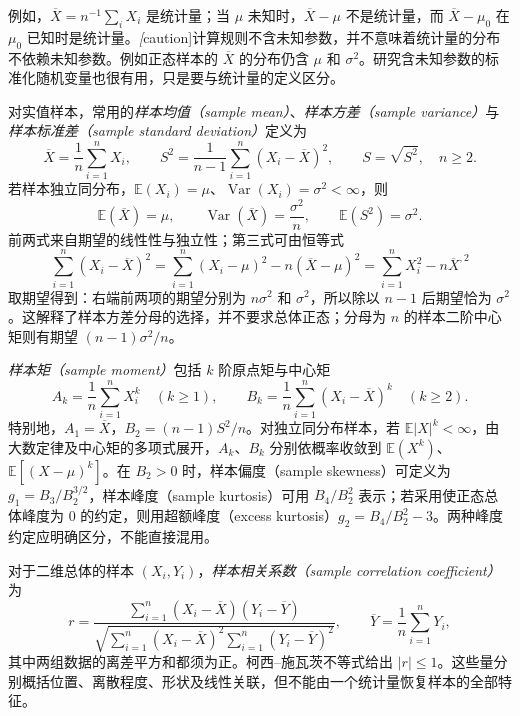 例如，$\overline X=n^{-1}\sum_iX_i$ 是统计量；当 $\mu$ 未知时，$\overline X-\mu$ 不是统计量，而 $\overline X-\mu_0$ 在 $\mu_0$ 已知时是统计量。\emph[caution]{计算规则不含未知参数，并不意味着统计量的分布不依赖未知参数。}例如正态样本的 $\overline X$ 的分布仍含 $\mu$ 和 $\sigma^2$。研究含未知参数的标准化随机变量也很有用，只是要与统计量的定义区分。

对实值样本，常用的\emph{样本均值（sample mean）}、\emph{样本方差（sample variance）}与\emph{样本标准差（sample standard deviation）}定义为
\begin{equation}
  \overline X=\frac1n\sum_{i=1}^{n}X_i,\qquad
  S^2=\frac1{n-1}\sum_{i=1}^{n}(X_i-\overline X)^2,\qquad
  S=\sqrt{S^2},\quad n\ge2.
  \label{eq:study-sample-mean-variance}
\end{equation}
若样本独立同分布，$\mathbb E(X_i)=\mu$、$\operatorname{Var}(X_i)=\sigma^2<\infty$，则
\begin{equation}
  \mathbb E(\overline X)=\mu,\qquad
  \operatorname{Var}(\overline X)=\frac{\sigma^2}{n},\qquad
  \mathbb E(S^2)=\sigma^2.
  \label{eq:study-sample-mean-variance-moments}
\end{equation}
前两式来自期望的线性性与独立性；第三式可由恒等式
\begin{equation}
  \sum_{i=1}^{n}(X_i-\overline X)^2
  =\sum_{i=1}^{n}(X_i-\mu)^2-n(\overline X-\mu)^2
  =\sum_{i=1}^{n}X_i^2-n\overline X^{,2}
  \label{eq:study-residual-squares}
\end{equation}
取期望得到：右端前两项的期望分别为 $n\sigma^2$ 和 $\sigma^2$，所以除以 $n-1$ 后期望恰为 $\sigma^2$。这解释了样本方差分母的选择，并不要求总体正态；分母为 $n$ 的样本二阶中心矩则有期望 $(n-1)\sigma^2/n$。

\emph{样本矩（sample moment）}包括 $k$ 阶原点矩与中心矩
\[
  A_k=\frac1n\sum_{i=1}^{n}X_i^k\quad(k\ge1),\qquad
  B_k=\frac1n\sum_{i=1}^{n}(X_i-\overline X)^k\quad(k\ge2).
\]
特别地，$A_1=\overline X$，$B_2=(n-1)S^2/n$。对独立同分布样本，若 $\mathbb E|X|^k<\infty$，由大数定律及中心矩的多项式展开，$A_k$、$B_k$ 分别依概率收敛到 $\mathbb E(X^k)$、$\mathbb E[(X-\mu)^k]$。在 $B_2>0$ 时，样本偏度（sample skewness）可定义为 $g_1=B_3/B_2^{3/2}$，样本峰度（sample kurtosis）可用 $B_4/B_2^2$ 表示；若采用使正态总体峰度为 $0$ 的约定，则用超额峰度（excess kurtosis）$g_2=B_4/B_2^2-3$。两种峰度约定应明确区分，不能直接混用。

对于二维总体的样本 $(X_i,Y_i)$，\emph{样本相关系数（sample correlation coefficient）}为
\[
  r=\frac{\sum_{i=1}^{n}(X_i-\overline X)(Y_i-\overline Y)}
  {\sqrt{\sum_{i=1}^{n}(X_i-\overline X)^2
               \sum_{i=1}^{n}(Y_i-\overline Y)^2}},
  \qquad \overline Y=\frac1n\sum_{i=1}^{n}Y_i,
\]
其中两组数据的离差平方和都须为正。柯西--施瓦茨不等式给出 $|r|\le1$。这些量分别概括位置、离散程度、形状及线性关联，但不能由一个统计量恢复样本的全部特征。

